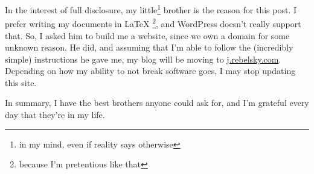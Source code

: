 \documentclass[12pt]{article}[titlepage]
\newcommand{\1}{\={a}}
\newcommand{\2}{\={e}}
\newcommand{\3}{\={\i}}
\newcommand{\4}{\=o}
\newcommand{\5}{\=u}
\newcommand{\6}{\={A}}
\renewcommand{\,}{\textsuperscript{,}}
\begin{document}
In the interest of full disclosure, my little\footnote{in my mind, even if reality says otherwise} brother is the reason for this post. I prefer writing my documents in LaTeX \footnote{because I'm pretentious like that}, and WordPress doesn't really support that. So, I asked him to build me a website, since we own a domain for some unknown reason. He did, and assuming that I'm able to follow the (incredibly simple) instructions he gave me, my blog will be moving to \href{j.rebelsky.com}{j.rebelsky.com}. Depending on how my ability to not break software goes, I may stop updating this site.

In summary, I have the best brothers anyone could ask for, and I'm grateful every day that they're in my life.
\end{document}
